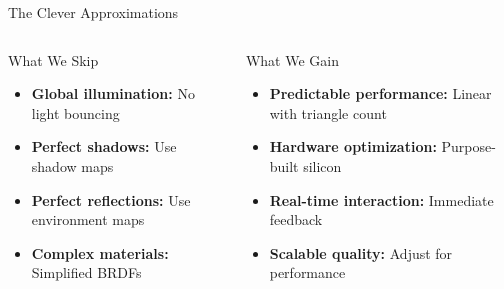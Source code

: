 \begin{frame}{The Clever Approximations}
  \begin{columns}
    \begin{column}{0.5\textwidth}
      \begin{raybox}{What We Skip}
        \begin{itemize}
          \item \textbf{Global illumination:} No light bouncing
          \item \textbf{Perfect shadows:} Use shadow maps
          \item \textbf{Perfect reflections:} Use environment maps
          \item \textbf{Complex materials:} Simplified BRDFs
        \end{itemize}
      \end{raybox}
    \end{column}
    \begin{column}{0.5\textwidth}
      \begin{conceptbox}{What We Gain}
        \begin{itemize}
          \item \textbf{Predictable performance:} Linear with triangle count
          \item \textbf{Hardware optimization:} Purpose-built silicon
          \item \textbf{Real-time interaction:} Immediate feedback
          \item \textbf{Scalable quality:} Adjust for performance
        \end{itemize}
      \end{conceptbox}
    \end{column}
  \end{columns}

\end{frame}

